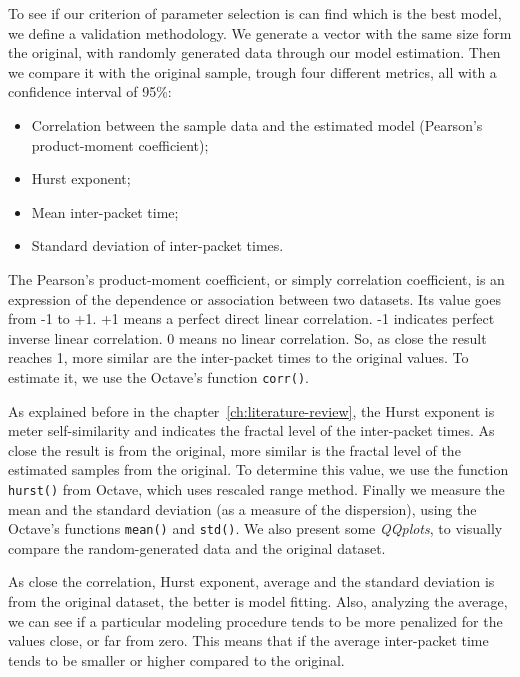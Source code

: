 To see if our criterion of parameter selection is can find which is the best model, we define a validation methodology. 
We generate a vector with the same size form the original, with randomly generated data through our model estimation. Then we compare it with the original sample, trough four different metrics, all with a confidence interval of 95\%:

\begin{itemize}
\item Correlation between the sample data and the estimated model (Pearson's product-moment coefficient);
\item Hurst exponent;
\item Mean inter-packet time;
\item Standard deviation of inter-packet times.
\end{itemize}

The Pearson's product-moment coefficient, or simply correlation coefficient,  is an expression of the dependence or association between two datasets. Its value goes from -1 to +1. +1 means a perfect direct linear correlation. -1 indicates perfect inverse linear correlation. 0 means no linear correlation. So, as close the result reaches 1, more similar are the inter-packet times to the original values. To estimate it, we use the Octave's function \texttt{corr()}.

As explained before in the chapter~\ref{ch:literature-review}, the Hurst exponent is meter self-similarity and indicates the fractal level of the inter-packet times. As close the result is from the original, more similar is the fractal level of the estimated samples from the original. To determine this value, we use the function \texttt{hurst()} from Octave, which uses rescaled range method.
Finally we measure the mean and the standard deviation (as a measure of the dispersion), using the Octave's functions \texttt{mean()} and \texttt{std()}. We also present some \textit{QQplots}, to visually compare the random-generated data and the original dataset. 

As close the correlation, Hurst exponent, average and the standard deviation is from the original dataset, the better is model fitting. Also, analyzing the average, we can see if a particular modeling procedure tends to be more penalized for the values close, or far from zero. This means that if the average inter-packet time tends to be smaller or higher compared to the original. 


